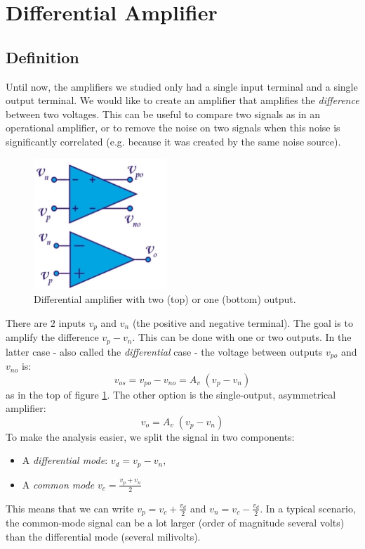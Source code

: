 \newpage
\section{Differential Amplifier}
\label{sec:diff_amplifier}
\subsection{Definition}
Until now, the amplifiers we studied only had a single input terminal and a single output terminal. We would like to create an amplifier that amplifies the \emph{difference} between two voltages. This can be useful to compare two signals as in an operational amplifier, or to remove the noise on two signals when this noise is significantly correlated (e.g. because it was created by the same noise source).
\begin{figure}[h!]
	\centering
	\includegraphics[width=5cm]{figures/ch02/diff_amp1.jpg}
	\caption{Differential amplifier with two (top) or one (bottom) output.}
	\label{fig:diff_amp1}
\end{figure}
There are $2$ inputs $v_p$ and $v_n$ (the positive and negative terminal). The goal is to amplify the difference $v_p - v_n$. This can be done with one or two outputs. In the latter case - also called the \emph{differential} case - the voltage between outputs $v_{po}$ and $v_{no}$ is:
$$
v_{os} = v_{po} - v_{no} = A_v \; (v_p - v_n)
$$
as in the top of figure \ref{fig:diff_amp1}. The other option is the single-output, asymmetrical amplifier:
$$
v_o = A_v \; (v_p - v_n)
$$
To make the analysis easier, we split the signal in two components:
\begin{itemize}
	\item A \emph{differential mode}: $v_d = v_p - v_n$,
	\item A \emph{common mode} $v_c = \frac{v_p + v_n}{2}$
\end{itemize}
This means that we can write $v_p = v_c + \frac{v_d}{2}$ and $v_n = v_c - \frac{v_d}{2}$. In a typical scenario, the common-mode signal can be a lot larger (order of magnitude several volts) than the differential mode (several milivolts).\\

